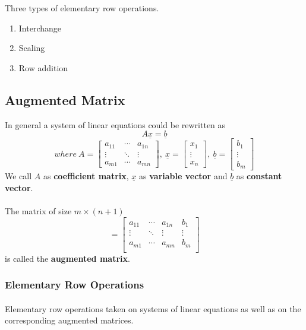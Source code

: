 \documentclass[14pt]{article}
\begin{document}
\begin{CJK}{UTF8}{min}
Three types of elementary row operations.
\begin{enumerate}
\item Interchange
\item Scaling
\item Row addition
\end{enumerate}

\subsection{Augmented Matrix}
In general a system of linear equations could be rewritten as 
$$A\underline{x}=\underline{b}$$
\begin{equation}
where\ A = \left[
\begin{array}{ccc}
a_{11} & \cdots & a_{1n}\\
\vdots & \ddots & \vdots\\
a_{m1} & \cdots & a_{mn}
\end{array}
\right],\ 
\underline{x} =\left[
\begin{array}{c}
x_{1}\\
\vdots\\
x_{n}
\end{array}
\right],\ 
\underline{b} =\left[
\begin{array}{c}
b_{1}\\
\vdots\\
b_{m}
\end{array}
\right]
\end{equation}
We call $A$ as \textbf{coefficient matrix}, $\underline{x}$ as \textbf{variable vector} and $\underline{b}$ as \textbf{constant vector}.\\\\
The matrix of size $m \times (n+1)$
\begin{equation}
[\ A\ |\ \underline{b}\ ] = \left[
\begin{array}{cccc}
a_{11} & \cdots & a_{1n} & b_1 \\
\vdots & \ddots & \vdots & \vdots\\
a_{m1} & \cdots & a_{mn} & b_m \\
\end{array}
\right]
\end{equation}
is called the \textbf{augmented matrix}.
\subsubsection{Elementary Row Operations}
\paragraph{}
Elementary row operations taken on systems of linear equations as well as on the corresponding augmented matrices.

\end{CJK}
\end{document}
